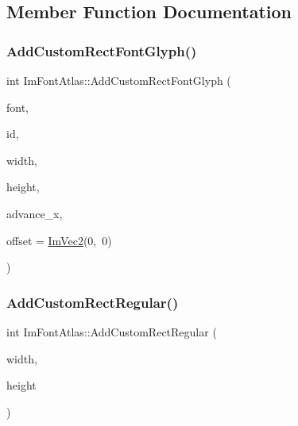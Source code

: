 \subsection{Member Function Documentation}
\mbox{\label{structImFontAtlas_a5643182be4e3f1a442cfa6cdc0321c7c}} 
\subsubsection{\texorpdfstring{Add\+Custom\+Rect\+Font\+Glyph()}{AddCustomRectFontGlyph()}}
{\footnotesize\ttfamily int Im\+Font\+Atlas\+::\+Add\+Custom\+Rect\+Font\+Glyph (\begin{DoxyParamCaption}\item[{\hyperlink{structImFont}{Im\+Font} $\ast$}]{font,  }\item[{Im\+Wchar}]{id,  }\item[{int}]{width,  }\item[{int}]{height,  }\item[{float}]{advance\+\_\+x,  }\item[{const \hyperlink{structImVec2}{Im\+Vec2} \&}]{offset = {\ttfamily \hyperlink{structImVec2}{Im\+Vec2}(0,~0)} }\end{DoxyParamCaption})}

\mbox{\label{structImFontAtlas_af048760e2d58ec93446e345deb887259}} 
\subsubsection{\texorpdfstring{Add\+Custom\+Rect\+Regular()}{AddCustomRectRegular()}}
{\footnotesize\ttfamily int Im\+Font\+Atlas\+::\+Add\+Custom\+Rect\+Regular (\begin{DoxyParamCaption}\item[{int}]{width,  }\item[{int}]{height }\end{DoxyParamCaption})}

\mbox{\label{structImFontAtlas_ad01c0f19a95d37a9e5ebab1e54525625}} 

